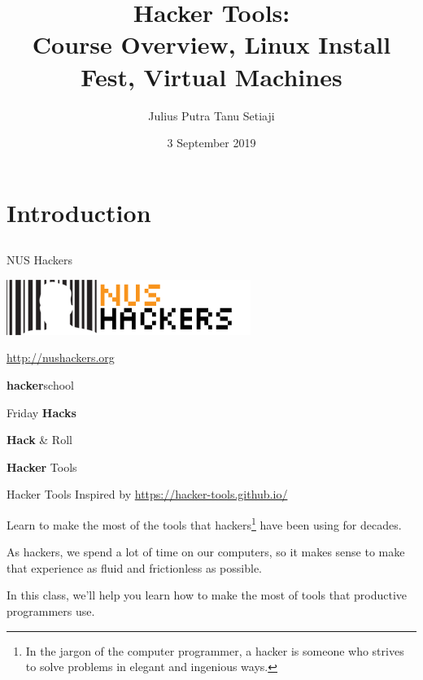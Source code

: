 \documentclass[12pt]{beamer}
\title{Hacker Tools: \\Course Overview, Linux Install Fest, Virtual Machines}
\author{Julius Putra Tanu Setiaji}
\date{3 September 2019}
\begin{document}
\frame[plain]{\titlepage}

\section{Introduction}
\subsection{}

\begin{frame}{NUS Hackers}

  \begin{center}
    \includegraphics[width=0.5\linewidth]{../NUSHackers}

    \url{http://nushackers.org}
  \end{center}

  \begin{center}
    \textbf{hacker}school

    Friday \textbf{Hacks}

    \textbf{Hack} \& Roll

    \textbf{Hacker} Tools
  \end{center}

\end{frame}

\begin{frame}{Hacker Tools}
  Inspired by \url{https://hacker-tools.github.io/}

  Learn to make the most of the tools that hackers\footnote{In the jargon of the computer programmer, a hacker is someone who strives to solve problems in elegant and ingenious ways.} have been using for decades.

  As hackers, we spend a lot of time on our computers, so it makes sense to make that experience as fluid and frictionless as possible.

  In this class, we'll help you learn how to make the most of tools that productive programmers use.
\end{frame}
\end{document}
